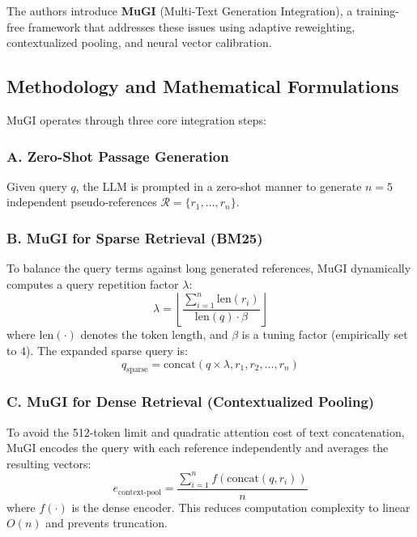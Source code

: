 \documentclass[11pt,a4paper]{article}
\begin{document}
The authors introduce \textbf{MuGI} (Multi-Text Generation Integration), a training-free framework that addresses these issues using adaptive reweighting, contextualized pooling, and neural vector calibration.

\subsection{Methodology and Mathematical Formulations}
MuGI operates through three core integration steps:

\subsubsection{A. Zero-Shot Passage Generation}
Given query $q$, the LLM is prompted in a zero-shot manner to generate $n=5$ independent pseudo-references $\mathcal{R} = \{r_1, \dots, r_n\}$.

\subsubsection{B. MuGI for Sparse Retrieval (BM25)}
To balance the query terms against long generated references, MuGI dynamically computes a query repetition factor $\lambda$:
\begin{equation}
\lambda = \left\lfloor \frac{\sum_{i=1}^n \text{len}(r_i)}{\text{len}(q) \cdot \beta} \right\rfloor
\end{equation}
where $\text{len}(\cdot)$ denotes the token length, and $\beta$ is a tuning factor (empirically set to $4$). The expanded sparse query is:
\begin{equation}
q_{\text{sparse}} = \text{concat}(q \times \lambda, r_1, r_2, \dots, r_n)
\end{equation}

\subsubsection{C. MuGI for Dense Retrieval (Contextualized Pooling)}
To avoid the 512-token limit and quadratic attention cost of text concatenation, MuGI encodes the query with each reference independently and averages the resulting vectors:
\begin{equation}
e_{\text{context-pool}} = \frac{\sum_{i=1}^n f(\text{concat}(q, r_i))}{n}
\end{equation}
where $f(\cdot)$ is the dense encoder. This reduces computation complexity to linear $O(n)$ and prevents truncation.
\end{document}
